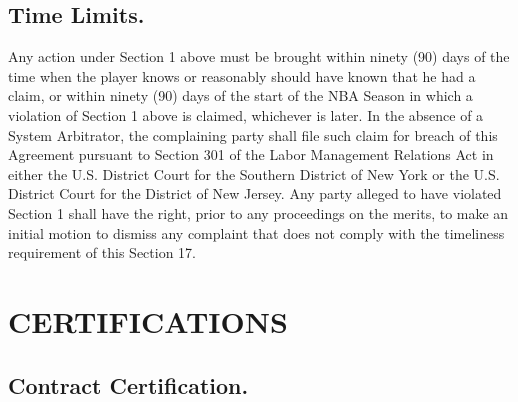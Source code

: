 \documentclass[
]{book}
\begin{document}
\hypertarget{time-limits.}{%
\section{Time Limits.}\label{time-limits.}}

Any action under Section 1 above must be brought within ninety (90) days of the time when the player knows or reasonably should have known that he had a claim, or within ninety (90) days of the start of the NBA Season in which a violation of Section 1 above is claimed, whichever is later. In the absence of a System Arbitrator, the complaining party shall file such claim for breach of this Agreement pursuant to Section 301 of the Labor Management Relations Act in either the U.S. District Court for the Southern District of New York or the U.S. District Court for the District of New Jersey. Any party alleged to have violated Section 1 shall have the right, prior to any proceedings on the merits, to make an initial motion to dismiss any complaint that does not comply with the timeliness requirement of this Section 17.

\hypertarget{certifications}{%
\chapter{CERTIFICATIONS}\label{certifications}}

\hypertarget{contract-certification.}{%
\section{Contract Certification.}\label{contract-certification.}}
\end{document}
